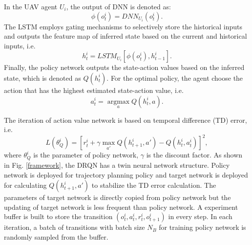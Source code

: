 \documentclass[conference]{IEEEtran}
\begin{document}
In the UAV agent $U_i$, the output of DNN is denoted as:
\begin{equation}\label{dnn_out}
  \phi\left(o_{t}^{i}\right)=DNN_{U_i}\left(o_{t}^{i}\right).
\end{equation}
The LSTM employs gating mechanisms to selectively store the historical inputs and outputs the feature map of inferred state based on the current and historical inputs, i.e. 
\begin{equation}\label{lstm_out}
  h^{i}_{t}=LSTM_{U_i}\left[\phi\left(o_{t}^{i}\right),h^{i}_{t-1}\right].
\end{equation}
Finally, the policy network outputs the state-action values based on the inferred state, which is denoted as $Q\left(h^{i}_{t}\right)$. For the optimal policy, the agent choose the action that has the highest estimated state-action value, i.e. 
\begin{equation}\label{action_policy}
  a^{i}_{t}=\mathop{\arg\max}\limits_{a} Q\left(h^{i}_{t}, a\right).
\end{equation}

The iteration of action value network is based on temporal difference (TD) error, i.e. 
\begin{equation}\label{q_iteration}
  L\left(\theta^{i}_{Q}\right)=\left[{r^{i}_{t}+\gamma \mathop{\max}\limits_{a'} Q\left({h^{i}_{t+1},a'}\right)-Q\left({h^{i}_{t},a^{i}_{t}}\right)}\right]^2, 
\end{equation}
where $\theta^{i}_{Q}$ is the parameter of policy network, $\gamma$ is the discount factor. As shown in Fig. \ref{framework}, the DRQN has a twin neural network structure. Policy network is deployed for trajectory planning policy and target network is deployed for calculating $Q\left({h^{i}_{t+1},a'}\right)$ to stabilize the TD error calculation. The parameters of target network is directly copied from policy network but the updating of target network is less frequent than policy network. A experiment buffer is built to store the transition $\left({o^{i}_{t}, a^{i}_{t}, r^{i}_{t}, o^{i}_{t+1}}\right)$ in every step. In each iteration, a batch of transitions with batch size $N_B$ for training policy network is randomly sampled from the buffer. 
\end{document}
